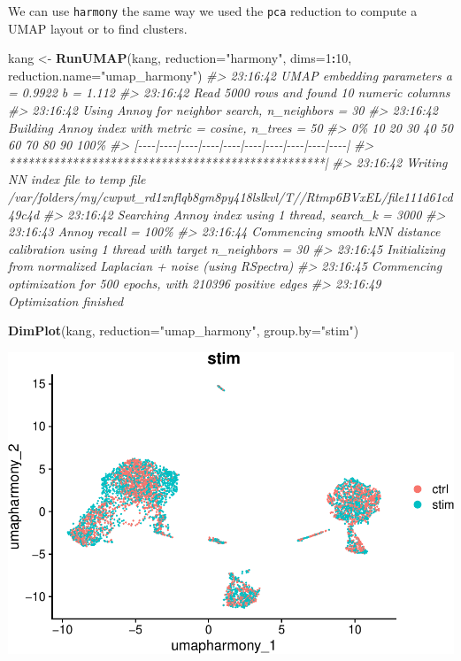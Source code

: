 \documentclass[
]{book}
\newenvironment{Shaded}{\begin{snugshade}}{\end{snugshade}}
\newcommand{\AttributeTok}[1]{\textcolor[rgb]{0.13,0.29,0.53}{#1}}
\newcommand{\CommentTok}[1]{\textcolor[rgb]{0.56,0.35,0.01}{\textit{#1}}}
\newcommand{\DecValTok}[1]{\textcolor[rgb]{0.00,0.00,0.81}{#1}}
\newcommand{\FunctionTok}[1]{\textcolor[rgb]{0.13,0.29,0.53}{\textbf{#1}}}
\newcommand{\NormalTok}[1]{#1}
\newcommand{\OtherTok}[1]{\textcolor[rgb]{0.56,0.35,0.01}{#1}}
\newcommand{\SpecialCharTok}[1]{\textcolor[rgb]{0.81,0.36,0.00}{\textbf{#1}}}
\newcommand{\StringTok}[1]{\textcolor[rgb]{0.31,0.60,0.02}{#1}}
\begin{document}
We can use \texttt{harmony} the same way we used the \texttt{pca} reduction to compute a UMAP layout or to find clusters.

\begin{Shaded}
\begin{Highlighting}[]
\NormalTok{kang }\OtherTok{\textless{}{-}} \FunctionTok{RunUMAP}\NormalTok{(kang, }\AttributeTok{reduction=}\StringTok{"harmony"}\NormalTok{, }\AttributeTok{dims=}\DecValTok{1}\SpecialCharTok{:}\DecValTok{10}\NormalTok{, }\AttributeTok{reduction.name=}\StringTok{"umap\_harmony"}\NormalTok{)}
\CommentTok{\#\textgreater{} 23:16:42 UMAP embedding parameters a = 0.9922 b = 1.112}
\CommentTok{\#\textgreater{} 23:16:42 Read 5000 rows and found 10 numeric columns}
\CommentTok{\#\textgreater{} 23:16:42 Using Annoy for neighbor search, n\_neighbors = 30}
\CommentTok{\#\textgreater{} 23:16:42 Building Annoy index with metric = cosine, n\_trees = 50}
\CommentTok{\#\textgreater{} 0\%   10   20   30   40   50   60   70   80   90   100\%}
\CommentTok{\#\textgreater{} [{-}{-}{-}{-}|{-}{-}{-}{-}|{-}{-}{-}{-}|{-}{-}{-}{-}|{-}{-}{-}{-}|{-}{-}{-}{-}|{-}{-}{-}{-}|{-}{-}{-}{-}|{-}{-}{-}{-}|{-}{-}{-}{-}|}
\CommentTok{\#\textgreater{} **************************************************|}
\CommentTok{\#\textgreater{} 23:16:42 Writing NN index file to temp file /var/folders/my/cwpwt\_rd1znflqb8gm8py418lslkvl/T//Rtmp6BVxEL/file111d61cd49c4d}
\CommentTok{\#\textgreater{} 23:16:42 Searching Annoy index using 1 thread, search\_k = 3000}
\CommentTok{\#\textgreater{} 23:16:43 Annoy recall = 100\%}
\CommentTok{\#\textgreater{} 23:16:44 Commencing smooth kNN distance calibration using 1 thread with target n\_neighbors = 30}
\CommentTok{\#\textgreater{} 23:16:45 Initializing from normalized Laplacian + noise (using RSpectra)}
\CommentTok{\#\textgreater{} 23:16:45 Commencing optimization for 500 epochs, with 210396 positive edges}
\CommentTok{\#\textgreater{} 23:16:49 Optimization finished}

\FunctionTok{DimPlot}\NormalTok{(kang, }\AttributeTok{reduction=}\StringTok{"umap\_harmony"}\NormalTok{, }\AttributeTok{group.by=}\StringTok{"stim"}\NormalTok{)}
\end{Highlighting}
\end{Shaded}

\includegraphics{scRNAseqInR_Doco_files/figure-latex/unnamed-chunk-70-1.pdf}
\end{document}

